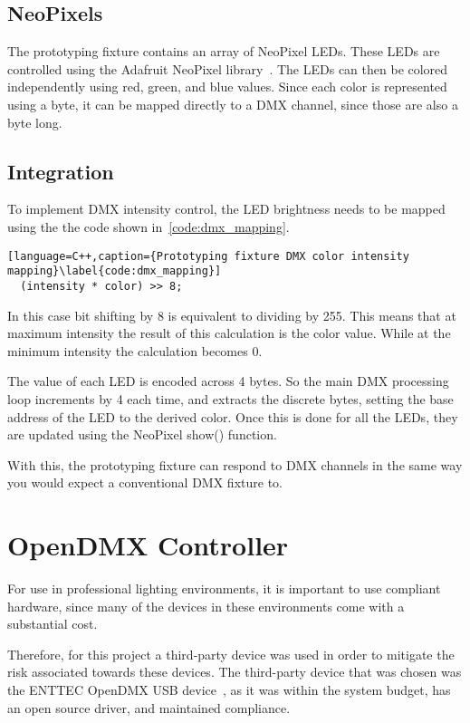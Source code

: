 \subsection{NeoPixels}
The prototyping fixture contains an array of NeoPixel LEDs.
These LEDs are controlled using the Adafruit NeoPixel library~\cite{NeoPixel}.
The LEDs can then be colored independently using red, green, and blue values.
Since each color is represented using a byte, it can be mapped directly to a DMX channel, since those are also a byte long.

\subsection{Integration}
To implement DMX intensity control, the LED brightness needs to be mapped using the the code shown in~\autoref{code:dmx_mapping}.

\begin{lstlisting}[language=C++,caption={Prototyping fixture DMX color intensity mapping}\label{code:dmx_mapping}]
  (intensity * color) >> 8;
\end{lstlisting}

In this case bit shifting by 8 is equivalent to dividing by 255.
This means that at maximum intensity the result of this calculation is the color value.
While at the minimum intensity the calculation becomes 0.

The value of each LED is encoded across 4 bytes.
So the main DMX processing loop increments by 4 each time,
and extracts the discrete bytes, setting the base address of the LED to the derived color.
Once this is done for all the LEDs, they are updated using the NeoPixel show() function.

With this, the prototyping fixture can respond to DMX channels in the same way you would expect a conventional DMX fixture to.

\section{OpenDMX Controller}
For use in professional lighting environments, it is important to use compliant hardware,
since many of the devices in these environments come with a substantial cost.

Therefore, for this project a third-party device was used in order to mitigate the risk associated towards these devices.
The third-party device that was chosen was the ENTTEC OpenDMX USB device~\cite{ENTTEC},
as it was within the system budget, has an open source driver, and maintained compliance.

